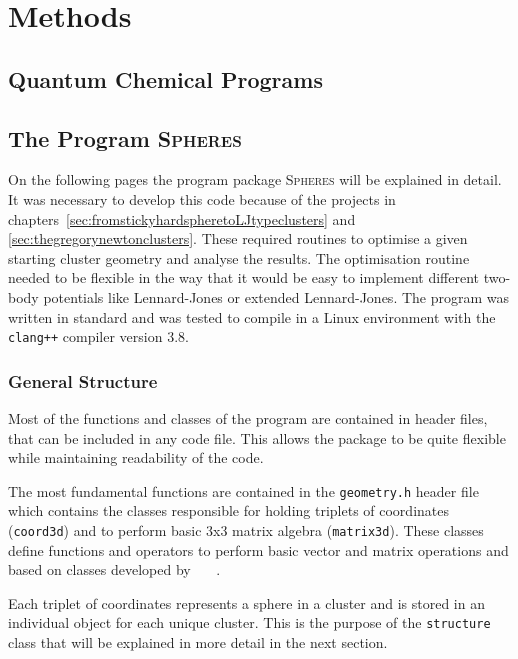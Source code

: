 
\part{Methods}
\label{sec:methods}

\chapter{Quantum Chemical Programs}
\label{sec:quantumchemicalprograms}

\chapter{The Program \textsc{Spheres}}
\label{sec:theprogramspheres}

On the following pages the program package \textsc{Spheres} will be explained
in detail. It was necessary to develop this code because of the projects in
chapters~\ref{sec:fromstickyhardspheretoLJtypeclusters} and
\ref{sec:thegregorynewtonclusters}. These required routines to optimise a given
starting cluster geometry and analyse the results. The optimisation routine
needed to be flexible in the way that it would be easy to implement different
two-body potentials like Lennard-Jones or extended Lennard-Jones. The program
was written in standard \Cpp and was tested to compile in a Linux environment
with the \verb|clang++| compiler version 3.8.

\section{General Structure}
\label{sec:generalstructure}

Most of the functions and classes of the program are contained in header files,
that can be included in any code file. This allows the package to be quite
flexible while maintaining readability of the code.

The most fundamental functions are contained in the \verb|geometry.h| header
file which contains the classes responsible for holding triplets of coordinates
(\verb|coord3d|) and to perform basic 3x3 matrix algebra (\verb|matrix3d|).
These classes define functions and operators to perform basic vector and matrix
operations and based on classes developed by ~~~.

Each triplet of coordinates represents a sphere in a cluster and is stored in
an individual object for each unique cluster. This is the purpose of the
\verb|structure| class that will be explained in more detail in the next
section.

